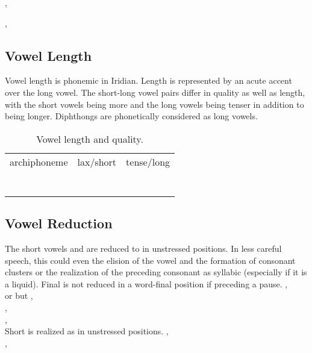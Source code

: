 \ex
{}, \\
\xe

\ex
{}, \\
\xe

\subsection{Vowel Length}

Vowel length is phonemic in Iridian. Length is represented by an acute accent over the long vowel. The short-long vowel pairs differ in quality as well as length, with the short vowels being more and the long vowels being tenser in addition to being longer. Diphthongs are phonetically considered as long vowels.

\begin{table}[h!]
	\small\centering
	\caption{Vowel length and quality.}
	\begin{tabu} to 0.7 \textwidth{MMM}
		\toprule \addlinespace
		{\sc archiphoneme} & {\sc lax/short} &{\sc tense/long}\\ \addlinespace\midrule
		\addlinespace
			& 	& 		\\\addlinespace
			& 	& 		\\\addlinespace
			& 	& 		\\\addlinespace
			& 	& 		\\\addlinespace
			& 	& 		\\\addlinespace
			& 	& 		\\\addlinespace
		\bottomrule
	\end{tabu}
\end{table}

\subsection{Vowel Reduction}
The short vowels  and  are reduced to  in unstressed positions. In less careful speech, this could even the elision of the vowel and the formation of consonant clusters or the realization of the preceding consonant as syllabic (especially if it is a liquid). Final  is not reduced in a word-final position if preceding a pause.
\pex
	\a
	, \\
	 or 
	\a
	but , \\
\xe
\ex {}, \\
\xe
\ex {}, \\
\xe
Short  is realized as  in unstressed positions.
\ex {}, \\
\xe
\ex {}, \\
\xe


